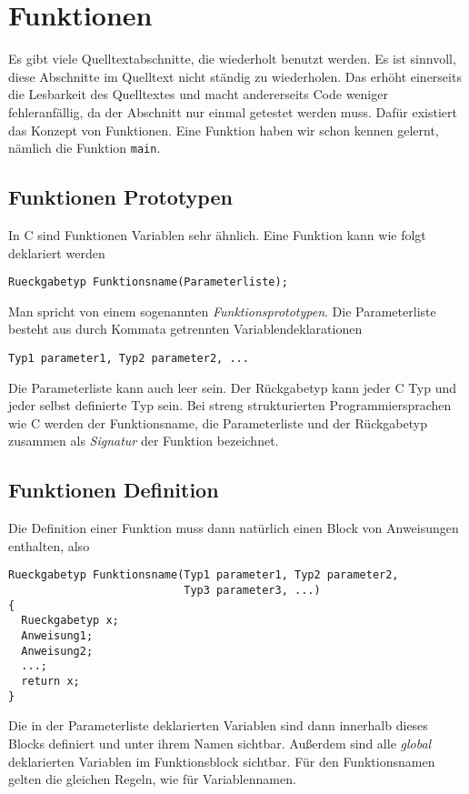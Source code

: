 \section{Funktionen}

Es gibt viele Quelltextabschnitte, die wiederholt benutzt werden.
Es ist sinnvoll, diese Abschnitte im Quelltext nicht ständig zu wiederholen.
Das erhöht einerseits die Lesbarkeit des Quelltextes und macht andererseits Code weniger fehleranfällig, da der Abschnitt nur einmal getestet werden muss.
Dafür existiert das Konzept von Funktionen.
Eine Funktion haben wir schon kennen gelernt, nämlich die Funktion \verb|main|. 

\subsection{Funktionen Prototypen}

In C sind Funktionen Variablen sehr ähnlich.
Eine Funktion kann wie folgt deklariert werden
\begin{lstlisting}
Rueckgabetyp Funktionsname(Parameterliste);
\end{lstlisting}
Man spricht von einem sogenannten \emph{Funktionsprototypen}.
Die Parameterliste besteht aus durch Kommata getrennten Variablendeklarationen
\begin{lstlisting}
Typ1 parameter1, Typ2 parameter2, ...
\end{lstlisting}
Die Parameterliste kann auch leer sein.
Der Rückgabetyp kann jeder C Typ und jeder selbst definierte Typ sein.
Bei streng strukturierten Programmiersprachen wie C werden der Funktionsname, die Parameterliste und der Rückgabetyp zusammen als \emph{Signatur} der Funktion bezeichnet.

\subsection{Funktionen Definition}

Die Definition einer Funktion muss dann natürlich einen Block von Anweisungen enthalten, also
\begin{lstlisting}[caption={Funktionen Prototyp}, belowcaptionskip=0.3em]
Rueckgabetyp Funktionsname(Typ1 parameter1, Typ2 parameter2,
                           Typ3 parameter3, ...)
{
  Rueckgabetyp x;
  Anweisung1;
  Anweisung2;
  ...;
  return x;
}
\end{lstlisting}
Die in der Parameterliste deklarierten Variablen sind dann innerhalb dieses Blocks definiert und unter ihrem Namen sichtbar.
Außerdem sind alle \emph{global} deklarierten Variablen im Funktionsblock sichtbar.
Für den Funktionsnamen gelten die gleichen Regeln, wie für Variablennamen.

